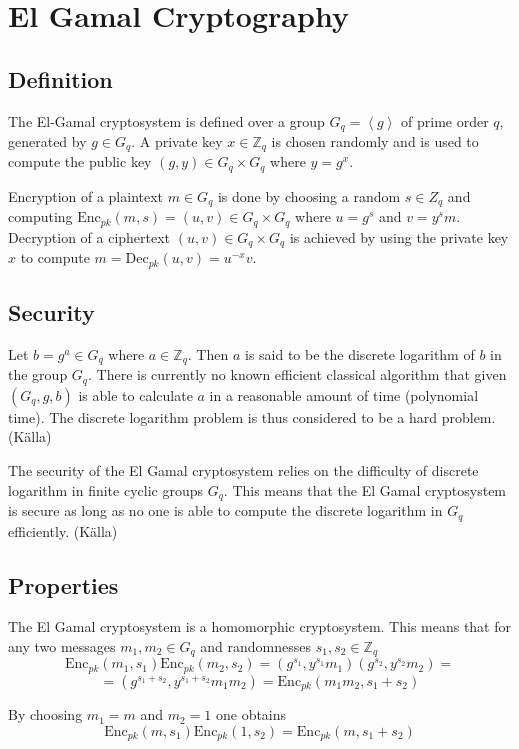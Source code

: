 \section{El Gamal Cryptography}

\subsection{Definition}
The El-Gamal cryptosystem is defined over a group $G_q =
\left<g\right>$ of prime order $q$, generated by $g \in G_q$. A
private key $x \in \mathbb{Z}_q$ is chosen randomly and is used to
compute the public key $(g,y) \in G_q \times G_q$ where $y =
g^x$. 

Encryption of a plaintext $m \in G_q$ is done by choosing a random $s
\in Z_q$ and computing $ \mathrm{Enc}_{pk}(m,s) = (u,v) \in G_q \times
G_q$ where $u = g^s$ and $v = y^sm$. Decryption of a ciphertext $(u,v)
\in G_q \times G_q$ is achieved by using the private key $x$ to
compute $m = \mathrm{Dec}_{pk}(u,v) = u^{-x}v$.

\subsection{Security}
Let $b = g^a \in G_q$ where $a \in \mathbb{Z}_q$. Then $a$ is said to
be the discrete logarithm of $b$ in the group $G_q$. There is
currently no known efficient classical algorithm that given $(G_q, g,
b)$ is able to calculate $a$ in a reasonable amount of time
(polynomial time). The discrete logarithm problem is thus considered
to be a hard problem. (Källa)

The security of the El Gamal cryptosystem relies on the difficulty of
discrete logarithm in finite cyclic groups $G_q$. This means that the
El Gamal cryptosystem is secure as long as no one is able to compute
the discrete logarithm in $G_q$ efficiently. (Källa)

\subsection{Properties}
The El Gamal cryptosystem is a homomorphic cryptosystem. This means
that for any two messages $m_1, m_2 \in G_q$ and randomnesses $s_1,
s_2 \in \mathbb{Z}_q$
$$
\mathrm{Enc}_{pk}(m_1, s_1)\mathrm{Enc}_{pk}(m_2, s_2) = (g^{s_1}, y^{s_1}m_1)(g^{s_2},y^{s_2}m_2) =
$$
$$
= (g^{s_1 + s_2}, y^{s_1 + s_2}m_1m_2) = \mathrm{Enc}_{pk}(m_1m_2, s_1 + s_2)
$$

By choosing $m_1 = m$ and $m_2 = 1$ one obtains
$$
\mathrm{Enc}_{pk}(m, s_1) \mathrm{Enc}_{pk}(1, s_2) = \mathrm{Enc}_{pk}(m, s_1 + s_2)
$$

